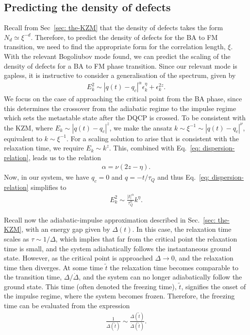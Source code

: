 \subsection{Predicting the density of defects}
Recall from Sec~\ref{sec: the-KZM} that the density of defects takes the form
\(N_d \simeq \xi^{-d}\).
Therefore, to predict the density of defects for the BA to FM transition, we
need to find the appropriate form for the correlation length, \(\xi \).
With the relevant Bogoliubov mode found, we can predict the scaling of the
density of defects for a BA to FM phase transition.
Since our relevant mode is gapless, it is instructive to consider a
generalisation of the spectrum, given by
\begin{align}\label{eq: dispersion-relation}
    E_k^2 \sim |q(t)-q_c|^{\alpha}\epsilon_k^{\eta}+\epsilon_k^{2z}.
\end{align}
We focus on the case of approaching the critical point from the BA phase, since
this determines the crossover from the adiabatic regime to the
impulse regime which sets the metastable state after the DQCP is crossed.
To be consistent with the KZM, where \(E_k \sim |q(t)-q_c|^{z}\), we make
the ansatz \(k \sim \xi^{-1} \sim |q(t)-q_c|^{\nu}\), equivalent to
\(k \sim \xi^{-1}\).
For a scaling solution to arise that is consistent with the relaxation time,
we require \(E_k \sim k^z\).
This, combined with Eq.~\eqref{eq: dispersion-relation}, leads us to the
relation
\begin{align}
    \alpha = \nu (2z-\eta).
\end{align}
Now, in our system, we have \(q_c = 0\) and \(q = -t/\tau_Q\) and thus
Eq.~\eqref{eq: dispersion-relation} simplifies to
\begin{align}\label{eq: dispersion-relation-simplified}
    E_k^2 \sim \frac{|t|^{\alpha}}{\tau_Q^{\alpha}}k^{\eta}.    
\end{align}

Recall now the adiabatic-impulse approximation described in
Sec.~\ref{sec: the-KZM}, with an energy gap given by \(\Delta(t)\).
In this case, the relaxation time scales as \(\tau \sim 1/\Delta \), which
implies that far from the critical point the relaxation time is small, and the
system adiabatically follows the instantaneous ground state.
However, as the critical point is approached \(\Delta \rightarrow 0\), and the
relaxation time then diverges.
At some time \(\tilde{t}\) the relaxation time becomes comparable to the
transition time, \(\Delta / \dot{\Delta}\), and the system can no longer
adiabatically follow the ground state.
This time (often denoted the freezing time), \(\tilde{t}\), signifies the onset
of the impulse regime, where the system becomes frozen.
Therefore, the freezing time can be evaluated from the expression
\begin{align}
    \frac{1}{\Delta(\tilde{t})} \sim
    \frac{\Delta(\tilde{t})}{\dot{\Delta}(\tilde{t})} .
\end{align}


